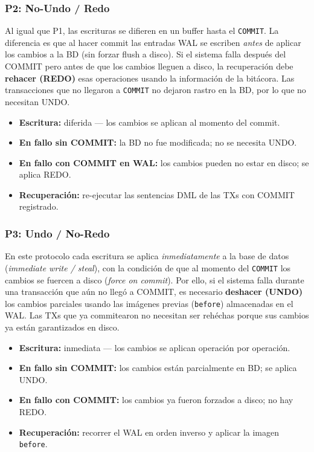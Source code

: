 \documentclass[12pt,letterpaper]{article}
\begin{document}
\subsubsection{P2: \textbf{No-Undo / Redo}}

Al igual que P1, las escrituras se difieren en un buffer hasta el \texttt{COMMIT}. La
diferencia es que al hacer commit las entradas WAL se escriben \emph{antes} de aplicar los
cambios a la BD (sin forzar flush a disco). Si el sistema falla después del COMMIT pero
antes de que los cambios lleguen a disco, la recuperación debe \textbf{rehacer (REDO)} esas
operaciones usando la información de la bitácora. Las transacciones que no llegaron a
\texttt{COMMIT} no dejaron rastro en la BD, por lo que no necesitan UNDO.

\begin{itemize}
  \item \textbf{Escritura:} diferida — los cambios se aplican al momento del commit.
  \item \textbf{En fallo sin COMMIT:} la BD no fue modificada; no se necesita UNDO.
  \item \textbf{En fallo con COMMIT en WAL:} los cambios pueden no estar en disco; se aplica REDO.
  \item \textbf{Recuperación:} re-ejecutar las sentencias DML de las TXs con COMMIT registrado.
\end{itemize}

\subsubsection{P3: \textbf{Undo / No-Redo}}

En este protocolo cada escritura se aplica \emph{inmediatamente} a la base de datos
(\textit{immediate write / steal}), con la condición de que al momento del \texttt{COMMIT}
los cambios se fuercen a disco (\textit{force on commit}). Por ello, si el sistema falla
durante una transacción que aún no llegó a COMMIT, es necesario \textbf{deshacer (UNDO)}
los cambios parciales usando las imágenes previas (\texttt{before}) almacenadas en el WAL.
Las TXs que ya commitearon no necesitan ser rehéchas porque sus cambios ya están garantizados
en disco.

\begin{itemize}
  \item \textbf{Escritura:} inmediata — los cambios se aplican operación por operación.
  \item \textbf{En fallo sin COMMIT:} los cambios están parcialmente en BD; se aplica UNDO.
  \item \textbf{En fallo con COMMIT:} los cambios ya fueron forzados a disco; no hay REDO.
  \item \textbf{Recuperación:} recorrer el WAL en orden inverso y aplicar la imagen \texttt{before}.
\end{itemize}
\end{document}
